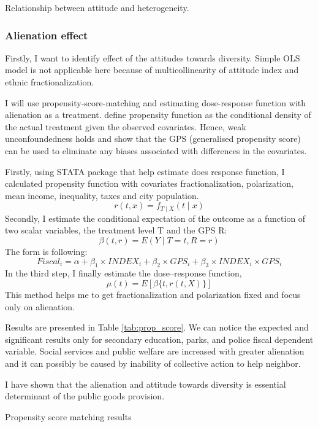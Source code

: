 \documentclass[letterpaper,11pt]{article}
\begin{document}
\begin{table}[H]
    \centering
    
    \caption{Relationship between attitude and heterogeneity.}
    \label{tab:frac - index}
\end{table}

\subsubsection{Alienation effect}
\label{subsec: alienation}

Firstly, I want to identify effect of the attitudes towards diversity. Simple OLS model is not applicable here because of multicollinearity of attitude index and ethnic fractionalization. 

I will use propensity-score-matching and estimating dose-response function with alienation as a treatment. \cite{prop} define propensity function as the conditional density of the actual treatment given the observed covariates. Hence, weak unconfoundedness holds and \cite{prop} show that the GPS (generalised propensity score) can be used to eliminate any biases associated with differences in the covariates.

Firstly, using \cite{package} STATA package that help estimate does response function, I calculated propensity function with covariates fractionalization, polarization, mean income, inequality, taxes and city population.
\[ r(t, x)=f_{T \mid X}(t \mid x) \]
Secondly, I estimate the conditional expectation of
the outcome as a function of two scalar variables, the treatment level T and the GPS R:
\[ \beta(t, r)=E(Y \mid T=t, R=r) \]
The form is following:
\[ Fiscal_i = \alpha + \beta_1 \times INDEX_i + \beta_2 \times GPS_i + \beta_3 \times INDEX_i \times GPS_i \]
In the third step, I finally estimate the dose–response function,
\[ \mu(t)=E[\beta\{t, r(t, X)\}] \]
This method helps me to get fractionalization and polarization fixed and focus only on alienation.

Results are presented in Table \ref{tab:prop_score}. We can notice the expected and significant results only for secondary education, parks, and police fiscal dependent variable. Social services and public welfare are increased with greater alienation and it can possibly be caused by inability of collective action to help neighbor.

I have shown that the alienation and attitude towards diversity is essential determinant of the public goods provision.

\begin{table}[h]
    \footnotesize
    \centering
    
    \caption{Propensity score matching results}
    \label{tab:prop_score}
\end{table}
\end{document}
